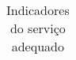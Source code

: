 \begin{table}[H]
{\begin{tabular}{ccccc}
\end{tabular}%
}
\caption{Indicadores do serviço adequado \cite{MARTINS}}
\label{tab:my-table}
\end{table}